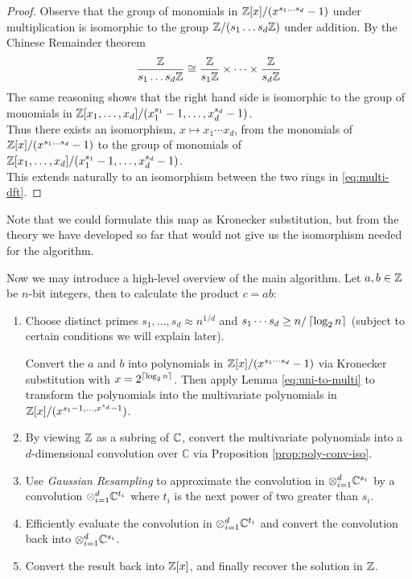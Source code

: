 \begin{proof}
    Observe that the group of monomials in ${\mathbb Z}[x]/(x^{s_1\ldots s_d} - 1)$ under multiplication is isomorphic to the group ${\mathbb Z}/(s_1 \ldots s_d{\mathbb Z})$ under addition. By the Chinese Remainder theorem
    \[
        \frac{{\mathbb Z}}{s_1\ldots s_d {\mathbb Z}} \cong \frac{{\mathbb Z}}{s_1 {\mathbb Z}} \times \cdots \times \frac{{\mathbb Z}}{s_d {\mathbb Z}}
    \]
    The same reasoning shows that the right hand side is isomorphic to the group of monomials in ${\mathbb Z}[x_1, \ldots, x_d]/(x_1^{s_1} - 1, \ldots, x_d^{s_d} - 1)$.\\
    Thus there exists an isomorphism, $x \mapsto x_1\cdots x_d$, from the monomials of ${\mathbb Z}[x]/(x^{s_1\ldots s_d} - 1)$ to the group of monomials of ${\mathbb Z}[x_1, \ldots, x_d]/(x_1^{s_1} - 1, \ldots, x_d^{s_d} - 1)$.\\
    This extends naturally to an isomorphism between the two rings in \eqref{eq:multi-dft}.
\end{proof}

Note that we could formulate this map as Kronecker substitution, but from the theory we have developed so far that would not give us the isomorphism needed for the algorithm.

Now we may introduce a high-level overview of the main algorithm. Let $a, b \in {\mathbb Z}$ be $n$-bit integers, then to calculate the product $c = ab$:

\begin{enumerate}
    \item  Choose distinct primes $s_1, \ldots, s_d \approx n^{1/d}$ and $s_1\cdots s_d \ge n/\left \lceil \log_2 n \right \rceil$ (subject to certain conditions we will explain later).

        Convert the $a$ and $b$ into polynomials in ${\mathbb Z}[x]/(x^{s_1\cdots s_d} - 1)$ via Kronecker substitution with $x = 2^{\left \lceil \log_2 n \right \rceil}$. Then apply Lemma \ref{eq:uni-to-multi} to transform the polynomials into the multivariate polynomials in ${\mathbb Z}[x]/(x^{s_1 - 1, \ldots, x^{s_d} - 1})$.
    \item By viewing ${\mathbb Z}$ as a subring of ${\mathbb C}$, convert the multivariate polynomials into a $d$-dimensional convolution over $\mathbb{C}$ via Proposition \ref{prop:poly-conv-iso}.
    \item Use \emph{Gaussian Resampling} to approximate the convolution in $\otimes_{i=1}^d {\mathbb C}^{s_i}$ by a convolution $\otimes_{i=1}^d {\mathbb C}^{t_i}$ where $t_i$ is the next power of two greater than $s_i$.
    \item Efficiently evaluate the convolution in $\otimes_{i=1}^d {\mathbb C}^{t_i}$ and convert the convolution back into $\otimes_{i=1}^d {\mathbb C}^{s_i}$.
    \item Convert the result back into ${\mathbb Z}[x]$, and finally recover the solution in ${\mathbb Z}$.
\end{enumerate}

